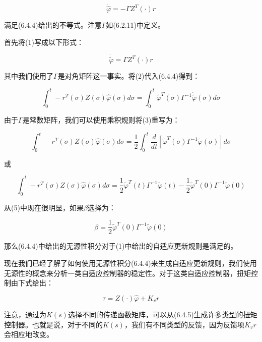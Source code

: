 \documentclass[12pt,a4paper]{ctexart}
\begin{document}
\begin{equation}
\dot{\hat{\varphi}} = -\Gamma Z^T(\cdot)r
\end{equation}

满足(6.4.4)给出的不等式。注意$\Gamma$如(6.2.11)中定义。

首先将(1)写成以下形式：

\begin{equation}
\dot{\tilde{\varphi}} = \Gamma Z^T(\cdot)r
\end{equation}

其中我们使用了$\Gamma$是对角矩阵这一事实。将(2)代入(6.4.4)得到：

\begin{equation}
\int_0^t -r^T(\sigma)Z(\sigma)\hat{\varphi}(\sigma)d\sigma = \int_0^t \tilde{\varphi}^T(\sigma)\Gamma^{-1}\dot{\tilde{\varphi}}(\sigma)d\sigma
\end{equation}

由于$\Gamma$是常数矩阵，我们可以使用乘积规则将(3)重写为：

\begin{equation}
\int_0^t -r^T(\sigma)Z(\sigma)\hat{\varphi}(\sigma)d\sigma = \frac{1}{2}\int_0^t \frac{d}{dt}\left[\tilde{\varphi}^T(\sigma)\Gamma^{-1}\tilde{\varphi}(\sigma)\right]d\sigma
\end{equation}

或

\begin{equation}
\int_0^t -r^T(\sigma)Z(\sigma)\hat{\varphi}(\sigma)d\sigma = \frac{1}{2}\tilde{\varphi}^T(t)\Gamma^{-1}\tilde{\varphi}(t) - \frac{1}{2}\tilde{\varphi}^T(0)\Gamma^{-1}\tilde{\varphi}(0)
\end{equation}

从(5)中现在很明显，如果$\beta$选择为：

\begin{equation}
\beta = \frac{1}{2}\tilde{\varphi}^T(0)\Gamma^{-1}\tilde{\varphi}(0)
\end{equation}

那么(6.4.4)中给出的无源性积分对于(1)中给出的自适应更新规则是满足的。

现在我们已经了解了如何使用无源性积分(6.4.4)来生成自适应更新规则，我们使用无源性的概念来分析一类自适应控制器的稳定性。对于这类自适应控制器，扭矩控制由下式给出：

\begin{equation}\label{eq:passivity-control}
\tau = Z(\cdot)\hat{\varphi} + K_v r
\end{equation}

注意，通过为$K(s)$选择不同的传递函数矩阵，可以从(6.4.5)生成许多类型的扭矩控制器。也就是说，对于不同的$K(s)$，我们有不同类型的反馈，因为反馈项$K_v r$会相应地改变。
\end{document}
